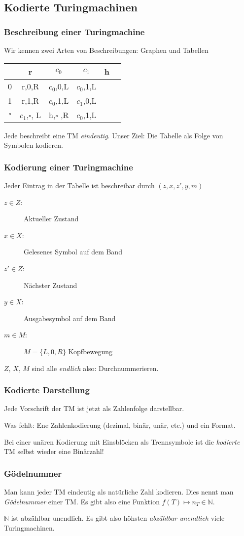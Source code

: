 \subsection{Kodierte Turingmachinen}
\begin{frame}
  \frametitle{Beschreibung einer Turingmachine}
  Wir kennen zwei Arten von Beschreibungen: Graphen und Tabellen
  \begin{center}
    \begin{tabular}{cccccc}
      \toprule
      & r & $c_0$ & $c_1$ & h \\
      \midrule
      0 & r,0,R   & $c_0$,0,L & $c_0$,1,L \\
      1 & r,1,R   & $c_0$,1,L & $c_1$,0,L \\
      $\square$  & $c_1$,$\square$, L & h,$\square$ ,R   & $c_0$,1,L & \hphantom{C,1,L} \\
      \bottomrule
    \end{tabular}
  \end{center}
  Jede beschreibt eine TM \emph{eindeutig}. Unser Ziel: Die Tabelle als Folge von Symbolen kodieren.
\end{frame}
\begin{frame}
  \frametitle{Kodierung einer Turingmachine}
  Jeder Eintrag in der Tabelle ist beschreibar durch $(z, x, z', y, m)$
  \begin{description}
    \item[$z \in Z$:] Aktueller Zustand
    \item[$x \in X$:] Gelesenes Symbol auf dem Band
    \item[$z' \in Z$:] Nächster Zustand
    \item[$y \in X$:] Ausgabesymbol auf dem Band
    \item[$m \in M$:] $M = \{L, 0, R\}$ Kopfbewegung
  \end{description}
  \begin{block}{}
    $Z$, $X$, $M$ sind alle \emph{endlich} also: Durchnummerieren.
  \end{block}
\end{frame}
\begin{frame}
  \frametitle{Kodierte Darstellung}
  Jede Vorschrift der TM ist jetzt als Zahlenfolge darstellbar.
  \begin{block}{Was fehlt:}
    Ene Zahlenkodierung (dezimal, binär, unär, etc.) und ein Format.
  \end{block}
  \begin{alertblock}{}
  Bei einer unären Kodierung mit Einsblöcken als Trennsymbole ist die \emph{kodierte} TM selbst wieder eine Binärzahl!
  \end{alertblock}
\end{frame}
\begin{frame}
  \frametitle{Gödelnummer}
  Man kann jeder TM eindeutig als natürliche Zahl kodieren. Dies nennt man \emph{Gödelnummer} einer TM.
  Es gibt also eine Funktion $f(T) \mapsto n_T \in \mathbb{N}$.
  \begin{alertblock}{}
    $\mathbb{N}$ ist abzählbar unendlich. Es gibt also höhsten \emph{abzählbar unendlich} viele Turingmachinen.
  \end{alertblock}
\end{frame}
